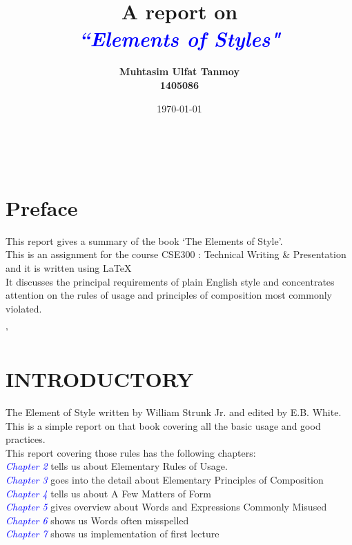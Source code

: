 \documentclass[10pt]{report}
\newcommand{\blueIt}[1]{\itshape \textcolor{blue}{#1}}
\begin{document}
\title{\bfseries \Huge A report on \\
\blueIt{``Elements of Styles"}}

\author{\bfseries Muhtasim Ulfat Tanmoy\\
1405086}
\date{\today}

\maketitle

\newpage

~

\newpage



\tableofcontents


\chapter* {Preface}

This report gives a summary of the book ‘The Elements of Style’.\\
This is an assignment for the course CSE300 : Technical 
Writing \& Presentation and it is
written using \LaTeX\\

It discusses the principal requirements of plain English style and concentrates attention on the rules
of usage and principles of composition most commonly violated. 


'



\chapter {INTRODUCTORY}
The Element of Style written by William Strunk Jr. and edited by E.B. White.\\
This is a simple report on that book covering all the basic usage and good practices.\\
This report covering those rules has the following chapters:\\
{\blueIt{Chapter 2}} tells us about Elementary Rules of Usage.\\
{\blueIt{Chapter 3}} goes into the detail about Elementary Principles of Composition\\
{\blueIt{Chapter 4}} tells us about A Few Matters of Form\\
{\blueIt{Chapter 5}} gives overview about Words and Expressions Commonly Misused\\
{\blueIt{Chapter 6}} shows us Words often misspelled\\
{\blueIt{Chapter 7}} shows us implementation of first lecture\\
\end{document}
